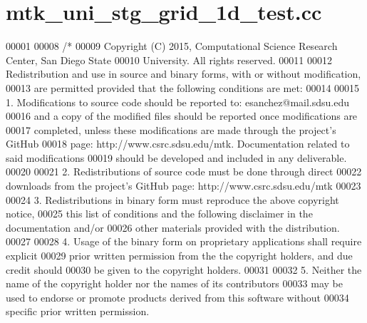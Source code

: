 \hypertarget{mtk__uni__stg__grid__1d__test_8cc_source}{\section{mtk\+\_\+uni\+\_\+stg\+\_\+grid\+\_\+1d\+\_\+test.\+cc}
\label{mtk__uni__stg__grid__1d__test_8cc_source}
}

\begin{DoxyCode}
00001 
00008 \textcolor{comment}{/*}
00009 \textcolor{comment}{Copyright (C) 2015, Computational Science Research Center, San Diego State}
00010 \textcolor{comment}{University. All rights reserved.}
00011 \textcolor{comment}{}
00012 \textcolor{comment}{Redistribution and use in source and binary forms, with or without modification,}
00013 \textcolor{comment}{are permitted provided that the following conditions are met:}
00014 \textcolor{comment}{}
00015 \textcolor{comment}{1. Modifications to source code should be reported to: esanchez@mail.sdsu.edu}
00016 \textcolor{comment}{and a copy of the modified files should be reported once modifications are}
00017 \textcolor{comment}{completed, unless these modifications are made through the project's GitHub}
00018 \textcolor{comment}{page: http://www.csrc.sdsu.edu/mtk. Documentation related to said modifications}
00019 \textcolor{comment}{should be developed and included in any deliverable.}
00020 \textcolor{comment}{}
00021 \textcolor{comment}{2. Redistributions of source code must be done through direct}
00022 \textcolor{comment}{downloads from the project's GitHub page: http://www.csrc.sdsu.edu/mtk}
00023 \textcolor{comment}{}
00024 \textcolor{comment}{3. Redistributions in binary form must reproduce the above copyright notice,}
00025 \textcolor{comment}{this list of conditions and the following disclaimer in the documentation and/or}
00026 \textcolor{comment}{other materials provided with the distribution.}
00027 \textcolor{comment}{}
00028 \textcolor{comment}{4. Usage of the binary form on proprietary applications shall require explicit}
00029 \textcolor{comment}{prior written permission from the the copyright holders, and due credit should}
00030 \textcolor{comment}{be given to the copyright holders.}
00031 \textcolor{comment}{}
00032 \textcolor{comment}{5. Neither the name of the copyright holder nor the names of its contributors}
00033 \textcolor{comment}{may be used to endorse or promote products derived from this software without}
00034 \textcolor{comment}{specific prior written permission.}

\end{DoxyCode}
